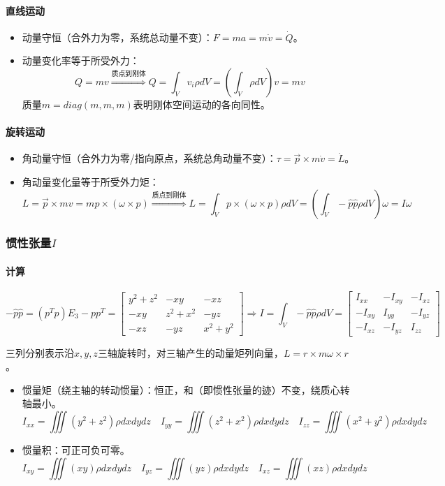 \documentclass[
12pt, %
a4paper, 
oneside, %
headinclude,footinclude, %
]{scrartcl}
\begin{document}
\paragraph{直线运动}
\begin{itemize}
\item 动量守恒（合外力为零，系统总动量不变）：$ F = ma = m\dot{v} = \dot{Q} $。
\item 动量变化率等于所受外力：
$$ 
Q = mv
\overset{\text{质点到刚体}}{\Longrightarrow}
Q = \int_V v_i \rho dV = (\int_V \rho dV) v = mv
$$
质量$ m = diag(m,m,m) $表明刚体空间运动的各向同性。
\end{itemize} 
\paragraph{旋转运动}
\begin{itemize}
\item 角动量守恒（合外力为零/指向原点，系统总角动量不变）：$ \tau = \vec{p} \times m\dot{v} = \dot{L} $。
\item 角动量变化量等于所受外力矩：
$$ 
L = \vec{p} \times mv = mp \times (\omega \times p)
\overset{\text{质点到刚体}}{\Longrightarrow}
L = \int_V p \times (\omega \times p) \rho dV = (\int_V -\hat{p}\hat{p}\rho dV) \omega = I\omega 
$$
\end{itemize} 
\subsubsection{惯性张量$ I $}
\paragraph{计算}
$$
-\hat{p}\hat{p} = (p^Tp)E_3 - pp^T = \begin{bmatrix} y^2 + z^2 & -xy & -xz \\ -xy & z^2 + x^2 & -yz \\ -xz & -yz & x^2 + y^2 \end{bmatrix}
\Rightarrow
I = \int_V -\hat{p}\hat{p}\rho dV = \begin{bmatrix} I_{xx} & -I_{xy} & -I_{xz} \\ -I_{xy} & I_{yy} & -I_{yz} \\ -I_{xz} & -I_{yz} & I_{zz} \end{bmatrix}
$$

三列分别表示沿$ x,y,z $三轴旋转时，对三轴产生的动量矩列向量，$ L = r \times m \omega \times r $。
\begin{itemize}
\item 惯量矩（绕主轴的转动惯量）：恒正，和（即惯性张量的迹）不变，绕质心转轴最小。
$$ I_{xx} = \iiint (y^2 + z^2)\rho dxdydz \quad I_{yy} = \iiint (z^2 + x^2)\rho dxdydz \quad I_{zz} = \iiint (x^2 + y^2)\rho dxdydz $$
\item 惯量积：可正可负可零。
$$ I_{xy} = \iiint (xy)\rho dxdydz \quad I_{yz} = \iiint (yz)\rho dxdydz \quad I_{xz} = \iiint (xz)\rho dxdydz $$
\end{itemize} 
\end{document}
